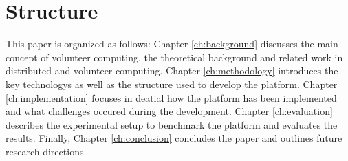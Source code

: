 \section{Structure}
\label{sec:intro:structure}
This paper is organized as follows: Chapter \ref{ch:background} discusses the main concept of volunteer computing, the theoretical background and related work in distributed and volunteer computing. Chapter \ref{ch:methodology} introduces the key technologys as well as the structure used to develop the platform. Chapter \ref{ch:implementation} focuses in deatial how the platform has been implemented and what challenges occured during the development. Chapter \ref{ch:evaluation} describes the experimental setup to benchmark the platform and evaluates the results. Finally, Chapter \ref{ch:conclusion} concludes the paper and outlines future research directions.